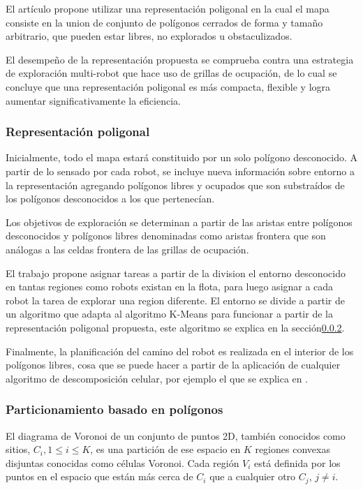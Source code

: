 El artículo propone utilizar una representación poligonal en la cual el mapa consiste en la union de conjunto de polígonos cerrados de forma y tamaño arbitrario, que pueden estar libres, no explorados u obstaculizados. 

El desempeño de la representación propuesta se comprueba contra una estrategia de exploración multi-robot que hace uso de grillas de ocupación, de lo cual se concluye que una representación poligonal es más compacta, flexible y logra aumentar significativamente la eficiencia.

\subsubsection{Representación poligonal}
Inicialmente, todo el mapa estará constituido por un solo polígono desconocido. A partir de lo sensado por cada robot, se incluye nueva información sobre entorno a la representación agregando polígonos libres y ocupados que son substraídos de los polígonos desconocidos a los que pertenecían.

Los objetivos de exploración se determinan a partir de las aristas entre polígonos desconocidos y polígonos libres denominadas como aristas frontera que son análogas a las celdas frontera de las grillas de ocupación.

El trabajo propone asignar tareas a partir de la division el entorno desconocido en tantas regiones como robots existan en la flota, para luego asignar a cada robot la tarea de explorar una region diferente. El entorno se divide a partir de un algoritmo que adapta al algoritmo K-Means para funcionar a partir de la representación poligonal propuesta, este algoritmo se explica en la sección\ref{subsubsec:particionamientovoronoi}.


Finalmente, la planificación del camino del robot es realizada en el interior de los polígonos libres, cosa que se puede hacer a partir de la aplicación de cualquier algoritmo de descomposición celular, por ejemplo el que se explica en \cite{schachter1978decomposition}.
   
\subsubsection{Particionamiento basado en polígonos}\label{subsubsec:particionamientovoronoi}
El diagrama de Voronoi\cite{fortune1987sweepline} de un conjunto de puntos 2D, también conocidos como sitios, $C_{i} , 1 \leq i \leq K$, es una partición de ese espacio en $K$ regiones convexas disjuntas conocidas como células Voronoi. Cada región $V_i$ está definida por los puntos en el espacio que están más cerca de $C_{i}$ que a cualquier otro $C_{j}$, $j\neq i$. 

